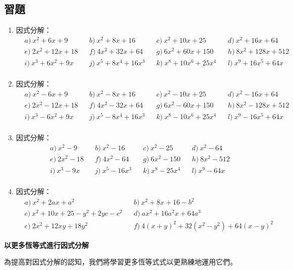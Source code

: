 \documentclass[12pt]{article}
\begin{document}
    \subsection*{習題}
    \begin{enumerate}
        \item 因式分解：\begin{align*}
            &a)\ x^2+6x+9&&b)\ x^2+8x+16&&c)\ x^2+10x+25&&d)\ x^2+16x+64\\
            &e)\ 2x^2+12x+18&&f)\ 4x^2+32x+64&&g)\ 6x^2+60x+150&&h)\ 8x^2+128x+512\\
            &i)\ x^3+6x^2+9x&&j)\ x^5+8x^4+16x^3&&k)\ x^8+10x^6+25x^4&&l)\ x^9+16x^5+64x\\
        \end{align*}
        \item 因式分解：\begin{align*}
            &a)\ x^2-6x+9&&b)\ x^2-8x+16&&c)\ x^2-10x+25&&d)\ x^2-16x+64\\
            &e)\ 2x^2-12x+18&&f)\ 4x^2-32x+64&&g)\ 6x^2-60x+150&&h)\ 8x^2-128x+512\\
            &i)\ x^3-6x^2+9x&&j)\ x^5-8x^4+16x^3&&k)\ x^8-10x^6+25x^4&&l)\ x^9-16x^5+64x\\
        \end{align*}
        \item 因式分解：\begin{align*}
            &a)\ x^2-9&&b)\ x^2-16&&c)\ x^2-25&&d)\ x^2-64\\
            &e)\ 2x^2-18&&f)\ 4x^2-64&&g)\ 6x^2-150&&h)\ 8x^2-512\\
            &i)\ x^3-9x&&j)\ x^5-16x^3&&k)\ x^8-25x^4&&l)\ x^9-64x\\
        \end{align*}
        \item 因式分解：\begin{align*}
            &a)\ x^2+2ax+a^2&&b)\ x^2+8x+16-b^2\\
            &c)\ x^2+10x+25-y^2+2yc-c^2&&d)\ ax^2+16a^2x+64a^3\\
            &e)\ 2x^2+12xy+18y^2&&f)\ 4(x+y)^2+32(x^2-y^2)+64(x-y)^2
        \end{align*}
    \end{enumerate}

    \begin{center}
        \textbf{以更多恆等式進行因式分解}
    \end{center}

    為提高對因式分解的認知，我們將學習更多恆等式式以更熟練地運用它們。
\end{document}
